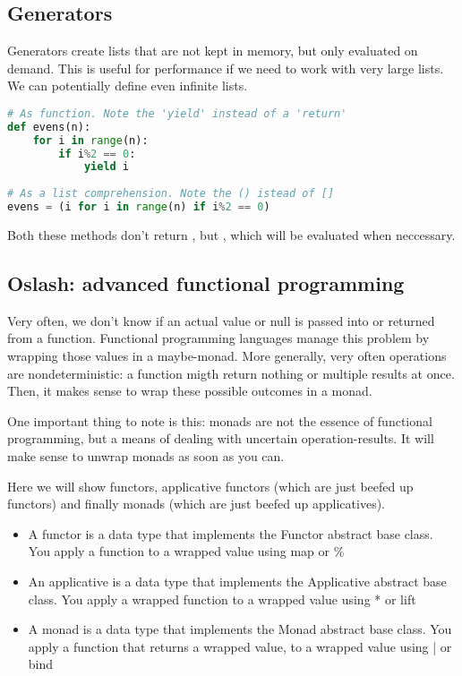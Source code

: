 \subsection{Generators}

Generators create lists that are not kept in memory, but only evaluated on demand. This is useful for performance if we need to work with very large lists. We can potentially define even infinite lists. 

\begin{lstlisting}[language=python]
# As function. Note the 'yield' instead of a 'return'
def evens(n):
    for i in range(n):
        if i%2 == 0:
            yield i
            
# As a list comprehension. Note the () istead of []
evens = (i for i in range(n) if i%2 == 0)
\end{lstlisting}

Both these methods don't return \inlinecode{[1, 2, 4, ..., n**2]}, but , which will be evaluated when neccessary.


\subsection{Oslash: advanced functional programming}

Very often, we don't know if an actual value or null is passed into or returned from a function. Functional programming languages manage this problem by wrapping those values in a maybe-monad. More generally, very often operations are nondeterministic: a function migth return nothing or multiple results at once. Then, it makes sense to wrap these possible outcomes in a monad. 


One important thing to note is this: monads are not the essence of functional programming, but a means of dealing with uncertain operation-results. It will make sense to unwrap monads as soon as you can.


Here we will show functors, applicative functors (which are just beefed up functors) and finally monads (which are just beefed up applicatives). 

\begin{itemize}
    \item A functor is a data type that implements the Functor abstract base class. You apply a function to a wrapped value using map or \% 
    \item An applicative is a data type that implements the Applicative abstract base class. You apply a wrapped function to a wrapped value using * or lift
    \item A monad is a data type that implements the Monad abstract base class.  You apply a function that returns a wrapped value, to a wrapped value using | or bind
\end{itemize}

